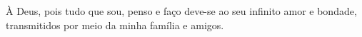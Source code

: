 À Deus, pois tudo que sou, penso e faço deve-se ao seu infinito amor e bondade, transmitidos por meio da minha família e amigos.